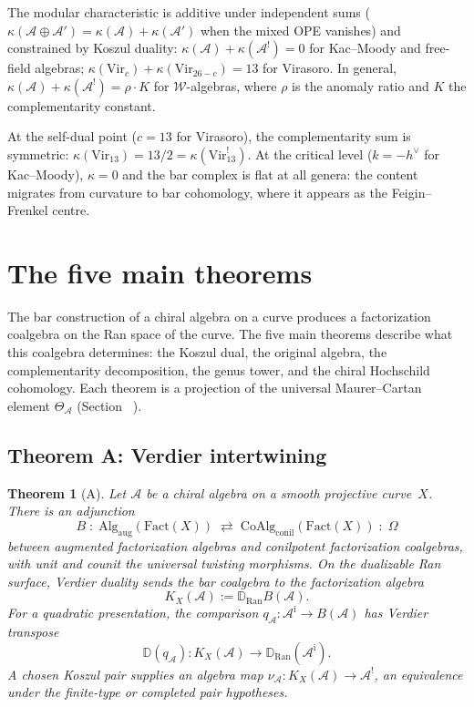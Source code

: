 \documentclass[11pt,reqno]{amsart}
\makeatletter
\newtheorem{theorem}{Theorem}[section]
\theoremstyle{definition}
\theoremstyle{remark}
\providecommand{\cA}{\mathcal{A}}
\providecommand{\Ran}{\mathrm{Ran}}
\providecommand{\Vir}{\mathrm{Vir}}
\numberwithin{equation}{section}
\let\ps@oldref\ref
\renewcommand{\ref}[1]{%
 \@ifundefined{r@#1}{\textit{full monograph}}{\ps@oldref{#1}}%
}
\makeatother
\begin{document}
The modular characteristic is additive under independent
sums ($\kappa(\cA \oplus \cA') = \kappa(\cA) + \kappa(\cA')$
when the mixed OPE vanishes) and constrained by Koszul
duality: $\kappa(\cA) + \kappa(\cA^!) = 0$ for
Kac--Moody and free-field algebras;
$\kappa(\Vir_c) + \kappa(\Vir_{26-c}) = 13$ for Virasoro.
In general, $\kappa(\cA) + \kappa(\cA^!) = \rho \cdot K$
for $\mathcal{W}$-algebras, where $\rho$ is the
anomaly ratio and $K$ the complementarity constant.

At the self-dual point ($c = 13$ for Virasoro), the
complementarity sum is symmetric:
$\kappa(\Vir_{13}) = 13/2 = \kappa(\Vir_{13}^!)$.
At the critical level ($k = -h^\vee$ for Kac--Moody),
$\kappa = 0$ and the bar complex is flat at all genera:
the content migrates from curvature to bar cohomology,
where it appears as the Feigin--Frenkel centre.


\section{The five main theorems}
\label{sec:five-theorems}

The bar construction of a chiral algebra on a curve produces
a factorization coalgebra on the Ran space of the curve.
The five main theorems describe what this coalgebra
determines: the Koszul dual, the original algebra,
the complementarity decomposition, the genus tower, and
the chiral Hochschild cohomology. Each theorem is a
projection of the universal Maurer--Cartan element
$\Theta_\cA$ (Section~\ref{sec:mc}).

\subsection{Theorem A: Verdier intertwining}
\label{ssec:thm-a}

\begin{theorem}[A]\label{thm:A}
Let\/ $\cA$ be a chiral algebra on a smooth projective
curve~$X$. There is an adjunction
\[
B
\;\colon\;
\mathrm{Alg}_{\mathrm{aug}}(\mathrm{Fact}(X))
\;\rightleftarrows\;
\mathrm{CoAlg}_{\mathrm{conil}}(\mathrm{Fact}(X))
\;\colon\;
\Omega
\]
between augmented factorization algebras and conilpotent
factorization coalgebras, with unit and counit the
universal twisting morphisms.  On the dualizable Ran surface,
Verdier duality sends the bar coalgebra to the factorization algebra
\begin{equation}\label{eq:verdier}
K_X(\cA):=\mathbb{D}_{\Ran}B(\cA).
\end{equation}
For a quadratic presentation, the comparison
$q_\cA\colon\cA^{\mathrm i}\to B(\cA)$ has Verdier transpose
\[
\mathbb D(q_\cA)\colon K_X(\cA)\longrightarrow
\mathbb D_{\Ran}(\cA^{\mathrm i}).
\]
A chosen Koszul pair supplies an algebra map
$\nu_\cA\colon K_X(\cA)\to\cA^!$, an equivalence under the
finite-type or completed pair hypotheses.
\end{theorem}
\end{document}
